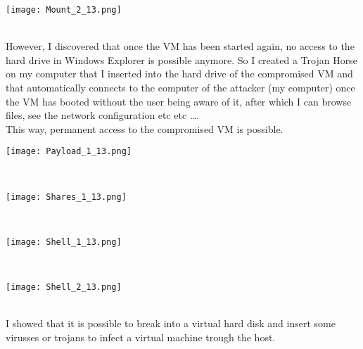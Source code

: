 \noindent\begin{minipage}{\textwidth}
    \centering
    \texttt{[image: Mount\_2\_13.png]}
\end{minipage}
$\;$ \\ \\
However, I discovered that once the VM has been started again, no access to the hard drive in Windows Explorer is possible anymore. So I created a Trojan Horse on my computer that I inserted into the hard drive of the compromised VM and that automatically connects to the computer of the attacker (my computer) once the VM has booted without the user being aware of it, after which I can browse files, see the network configuration etc etc \ldots .\\
This way, permanent access to the compromised VM is possible. \\
\noindent\begin{minipage}{\textwidth}
    \centering
    \texttt{[image: Payload\_1\_13.png]}
\end{minipage}
$\;$ \\ \\
\noindent\begin{minipage}{\textwidth}
    \centering
    \texttt{[image: Shares\_1\_13.png]}
\end{minipage}
$\;$ \\ \\
\noindent\begin{minipage}{\textwidth}
    \centering
    \texttt{[image: Shell\_1\_13.png]}
\end{minipage}
$\;$ \\ \\
\noindent\begin{minipage}{\textwidth}
    \centering
    \texttt{[image: Shell\_2\_13.png]}
\end{minipage}
$\;$ \\ \\
I showed that it is possible to break into a virtual hard disk and insert some virusses or trojans to infect a virtual machine trough the host.

